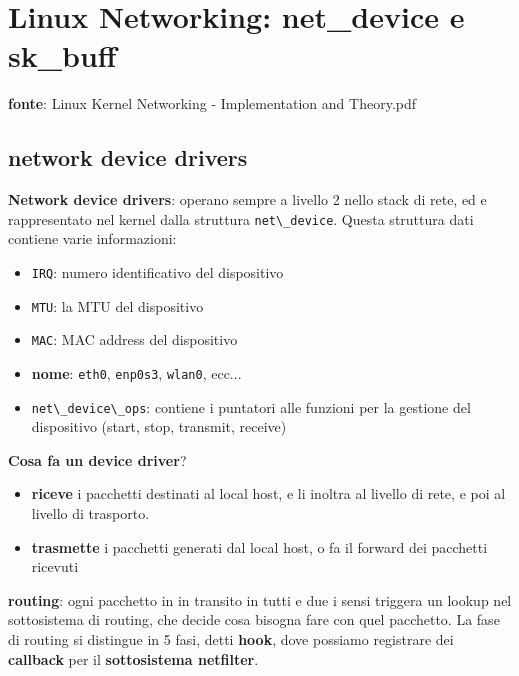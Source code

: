 \section{Linux Networking: net\_device e
sk\_buff}\label{linux-networking-net_device-e-sk_buff}

\textbf{fonte}: Linux Kernel Networking - Implementation and Theory.pdf

\subsection{network device drivers}\label{network-device-drivers}

\textbf{Network device drivers}: operano sempre a livello 2 nello stack
di rete, ed e\textquotesingle{} rappresentato nel kernel dalla struttura
\passthrough{\lstinline!net\_device!}. Questa struttura dati contiene
varie informazioni:

\begin{itemize}
\tightlist
\item
  \passthrough{\lstinline!IRQ!}: numero identificativo del dispositivo
\item
  \passthrough{\lstinline!MTU!}: la MTU del dispositivo
\item
  \passthrough{\lstinline!MAC!}: MAC address del dispositivo
\item
  \textbf{nome}: \passthrough{\lstinline!eth0!},
  \passthrough{\lstinline!enp0s3!}, \passthrough{\lstinline!wlan0!},
  ecc...
\item
  \passthrough{\lstinline!net\_device\_ops!}: contiene i puntatori alle
  funzioni per la gestione del dispositivo (start, stop, transmit,
  receive)
\end{itemize}

\textbf{Cosa fa un device driver}?

\begin{itemize}
\tightlist
\item
  \textbf{riceve} i pacchetti destinati al local host, e li inoltra al
  livello di rete, e poi al livello di trasporto.
\item
  \textbf{trasmette} i pacchetti generati dal local host, o fa il
  forward dei pacchetti ricevuti
\end{itemize}

\textbf{routing}: ogni pacchetto in in transito in tutti e due i sensi
triggera un lookup nel sottosistema di routing, che decide cosa bisogna
fare con quel pacchetto. La fase di routing si distingue in 5 fasi,
detti \textbf{hook}, dove possiamo registrare dei \textbf{callback} per
il \textbf{sottosistema netfilter}.

